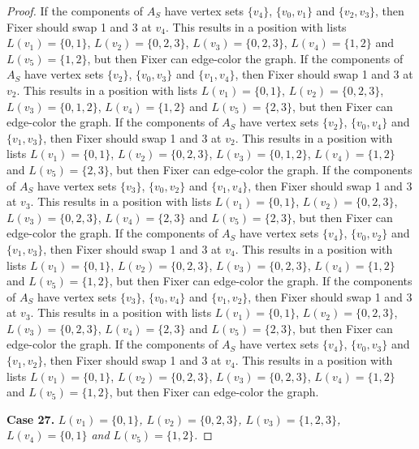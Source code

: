 \documentclass[12pt]{amsart}
\theoremstyle{plain}
\theoremstyle{definition}
\theoremstyle{remark}
\begin{document}
\begin{proof}
If the components of $A_S$ have vertex sets $\{v_4\}$, $\{v_0, v_1\}$ and $\{v_2, v_3\}$, then Fixer should swap 1 and 3 at $v_4$. This results in a position with lists $L(v_1) = \{0, 1\}$, $L(v_2) = \{0, 2, 3\}$, $L(v_3) = \{0, 2, 3\}$, $L(v_4) = \{1, 2\}$ and $L(v_5) = \{1, 2\}$, but then Fixer can edge-color the graph.
If the components of $A_S$ have vertex sets $\{v_2\}$, $\{v_0, v_3\}$ and $\{v_1, v_4\}$, then Fixer should swap 1 and 3 at $v_2$. This results in a position with lists $L(v_1) = \{0, 1\}$, $L(v_2) = \{0, 2, 3\}$, $L(v_3) = \{0, 1, 2\}$, $L(v_4) = \{1, 2\}$ and $L(v_5) = \{2, 3\}$, but then Fixer can edge-color the graph.
If the components of $A_S$ have vertex sets $\{v_2\}$, $\{v_0, v_4\}$ and $\{v_1, v_3\}$, then Fixer should swap 1 and 3 at $v_2$. This results in a position with lists $L(v_1) = \{0, 1\}$, $L(v_2) = \{0, 2, 3\}$, $L(v_3) = \{0, 1, 2\}$, $L(v_4) = \{1, 2\}$ and $L(v_5) = \{2, 3\}$, but then Fixer can edge-color the graph.
If the components of $A_S$ have vertex sets $\{v_3\}$, $\{v_0, v_2\}$ and $\{v_1, v_4\}$, then Fixer should swap 1 and 3 at $v_3$. This results in a position with lists $L(v_1) = \{0, 1\}$, $L(v_2) = \{0, 2, 3\}$, $L(v_3) = \{0, 2, 3\}$, $L(v_4) = \{2, 3\}$ and $L(v_5) = \{2, 3\}$, but then Fixer can edge-color the graph.
If the components of $A_S$ have vertex sets $\{v_4\}$, $\{v_0, v_2\}$ and $\{v_1, v_3\}$, then Fixer should swap 1 and 3 at $v_4$. This results in a position with lists $L(v_1) = \{0, 1\}$, $L(v_2) = \{0, 2, 3\}$, $L(v_3) = \{0, 2, 3\}$, $L(v_4) = \{1, 2\}$ and $L(v_5) = \{1, 2\}$, but then Fixer can edge-color the graph.
If the components of $A_S$ have vertex sets $\{v_3\}$, $\{v_0, v_4\}$ and $\{v_1, v_2\}$, then Fixer should swap 1 and 3 at $v_3$. This results in a position with lists $L(v_1) = \{0, 1\}$, $L(v_2) = \{0, 2, 3\}$, $L(v_3) = \{0, 2, 3\}$, $L(v_4) = \{2, 3\}$ and $L(v_5) = \{2, 3\}$, but then Fixer can edge-color the graph.
If the components of $A_S$ have vertex sets $\{v_4\}$, $\{v_0, v_3\}$ and $\{v_1, v_2\}$, then Fixer should swap 1 and 3 at $v_4$. This results in a position with lists $L(v_1) = \{0, 1\}$, $L(v_2) = \{0, 2, 3\}$, $L(v_3) = \{0, 2, 3\}$, $L(v_4) = \{1, 2\}$ and $L(v_5) = \{1, 2\}$, but then Fixer can edge-color the graph.

\noindent\textbf{Case 27.  }\textit{$L(v_1) = \{0, 1\}$, $L(v_2) = \{0, 2, 3\}$, $L(v_3) = \{1, 2, 3\}$, $L(v_4) = \{0, 1\}$ and $L(v_5) = \{1, 2\}$.}


\end{proof}
\end{document}
